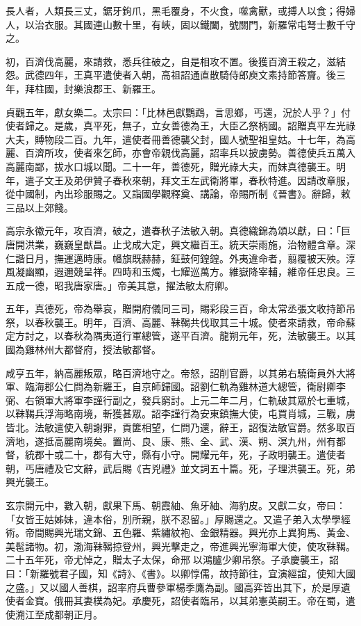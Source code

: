 \begin{pinyinscope}
 長人者，人類長三丈，鋸牙鉤爪，黑毛覆身，不火食，噬禽獸，或搏人以食；得婦人，以治衣服。其國連山數十里，有峽，固以鐵闔，號關門，新羅常屯弩士數千守之。



 初，百濟伐高麗，來請救，悉兵往破之，自是相攻不置。後獲百濟王殺之，滋結怨。武德四年，王真平遣使者入朝，高祖詔通直散騎侍郎庾文素持節答齎。後三年，拜柱國，封樂浪郡王、新羅王。



 貞觀五年，獻女樂二。太宗曰：「比林邑獻鸚鵡，言思鄉，丐還，況於人乎？」付使者歸之。是歲，真平死，無子，立女善德為王，大臣乙祭柄國。詔贈真平左光祿大夫，賻物段二百。九年，遣使者冊善德襲父封，國人號聖祖皇姑。十七年，為高麗、百濟所攻，使者來乞師，亦會帝親伐高麗，詔率兵以披虜勢。善德使兵五萬入高麗南鄙，拔水口城以聞。二十一年，善德死，贈光祿大夫，而妹真德襲王。明年，遣子文王及弟伊贊子春秋來朝，拜文王左武衛將軍，春秋特進。因請改章服，從中國制，內出珍服賜之。又詣國學觀釋奠、講論，帝賜所制《晉書》。辭歸，敕三品以上郊餞。



 高宗永徽元年，攻百濟，破之，遣春秋子法敏入朝。真德織錦為頌以獻，曰：「巨唐開洪業，巍巍皇猷昌。止戈成大定，興文繼百王。統天崇雨施，治物體含章。深仁諧日月，撫運邁時康。幡旗既赫赫，鉦鼓何鍠鍠。外夷違命者，翦覆被天殃。淳風凝幽顯，遐邇競呈祥。四時和玉燭，七耀巡萬方。維嶽降宰輔，維帝任忠良。三五成一德，昭我唐家唐。」帝美其意，擢法敏太府卿。



 五年，真德死，帝為舉哀，贈開府儀同三司，賜彩段三百，命太常丞張文收持節吊祭，以春秋襲王。明年，百濟、高麗、靺鞨共伐取其三十城。使者來請救，帝命蘇定方討之，以春秋為隅夷道行軍總管，遂平百濟。龍朔元年，死，法敏襲王。以其國為雞林州大都督府，授法敏都督。



 咸亨五年，納高麗叛眾，略百濟地守之。帝怒，詔削官爵，以其弟右驍衛員外大將軍、臨海郡公仁問為新羅王，自京師歸國。詔劉仁軌為雞林道大總管，衛尉卿李弼、右領軍大將軍李謹行副之，發兵窮討。上元二年二月，仁軌破其眾於七重城，以靺鞨兵浮海略南境，斬獲甚眾。詔李謹行為安東鎮撫大使，屯買肖城，三戰，虜皆北。法敏遣使入朝謝罪，貢篚相望，仁問乃還，辭王，詔復法敏官爵。然多取百濟地，遂抵高麗南境矣。置尚、良、康、熊、全、武、漢、朔、溟九州，州有都督，統郡十或二十，郡有大守，縣有小守。開耀元年，死，子政明襲王。遣使者朝，丐唐禮及它文辭，武后賜《吉兇禮》並文詞五十篇。死，子理洪襲王。死，弟興光襲王。



 玄宗開元中，數入朝，獻果下馬、朝霞紬、魚牙紬、海豹皮。又獻二女，帝曰：「女皆王姑姊妹，違本俗，別所親，朕不忍留。」厚賜還之。又遣子弟入太學學經術。帝間賜興光瑞文錦、五色羅、紫繡紋袍、金銀精器。興光亦上異狗馬、黃金、美髢諸物。初，渤海靺鞨掠登州，興光擊走之，帝進興光寧海軍大使，使攻靺鞨。二十五年死，帝尤悼之，贈太子太保，命邢以鴻臚少卿吊祭。子承慶襲王，詔曰：「新羅號君子國，知《詩》、《書》。以卿惇儒，故持節往，宜演經誼，使知大國之盛。」又以國人善棋，詔率府兵曹參軍楊季鷹為副。國高弈皆出其下，於是厚遺使者金寶。俄冊其妻樸為妃。承慶死，詔使者臨吊，以其弟憲英嗣王。帝在蜀，遣使溯江至成都朝正月。




\end{pinyinscope}
